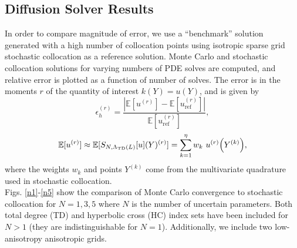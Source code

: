 \documentclass[11pt]{article}
\newcommand{\expv}[1]{\ensuremath{\mathbb{E}[ #1]}}
\begin{document}
\subsection{Diffusion Solver Results}
In order to compare magnitude of error, we use a ``benchmark'' solution generated with a high number of collocation points using isotropic sparse grid stochastic collocation as a reference solution.  Monte Carlo and stochastic collocation solutions for varying numbers of PDE solves are computed, and relative error is plotted as a function of number of solves.  The error is in the moments $r$ of the quantity of interest $k(Y)=u(Y)$, and is given by
\begin{equation}
\epsilon_h^{(r)}=\frac{|\expv{u^{(r)}}-\expv{u_\text{ref}^{(r)}}|}{\expv{u_\text{ref}^{(r)}}},
\end{equation}
\begin{equation}
\expv{u^{(r)}}\approx\expv{S_{N,\Lambda_\text{TD}(L)}[u](Y)^{(r)}}=\sum_{k=1}^\eta w_k ~u^{(r)}\qty(Y^{(k)}),
\end{equation}
where the weights $w_k$ and points $Y^{(k)}$ come from the multivariate quadrature used in stochastic collocation.\\

Figs. \ref{n1}-\ref{n5} show the comparison of Monte Carlo convergence to stochastic collocation for $N=1,3,5$ where $N$ is the number of uncertain parameters.  Both total degree (TD) and hyperbolic cross (HC) index sets have been included for $N>1$ (they are indistinguishable for $N=1$).  Additionally, we include two low-anisotropy anisotropic grids.\\
\end{document}

